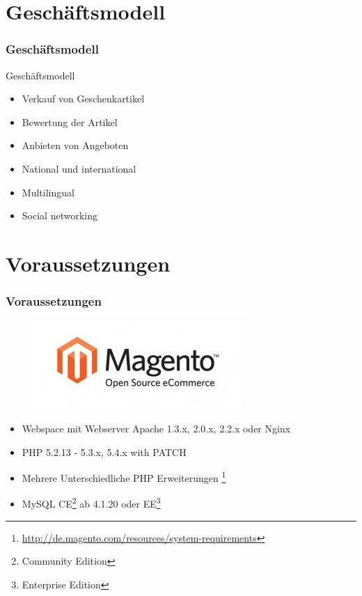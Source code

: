 \documentclass[xcolor=dvipsnames]{beamer}
\begin{document}
\section{Geschäftsmodell}
\begin{frame} %
  \frametitle{Geschäftsmodell} %
  \begin{block}{Geschäftsmodell}
	  \begin{itemize}
		\item Verkauf von Geschenkartikel
		\item Bewertung der Artikel
		\item Anbieten von Angeboten
		\item National und international
		\item Multilingual
		\item Social networking
	  \end{itemize}
  \end{block}
\end{frame}

\section{Voraussetzungen}
\begin{frame} %
  \frametitle{Voraussetzungen} %
  
	\begin{figure}
	\includegraphics[scale=0.4]{magento-logo-300x127.jpg}
	\end{figure}

\begin{block}{}
	  \begin{itemize}
		\item Webspace mit Webserver Apache 1.3.x, 2.0.x, 2.2.x oder Nginx
		\item PHP 5.2.13 - 5.3.x, 5.4.x with PATCH 
		\item Mehrere Unterschiedliche PHP Erweiterungen \footnote{\url{http://de.magento.com/resources/system-requirements}}
		\item MySQL CE\footnote{Community Edition} ab 4.1.20 oder EE\footnote{Enterprise Edition} 
	  \end{itemize}
  \end{block}
\end{frame}
\end{document}
